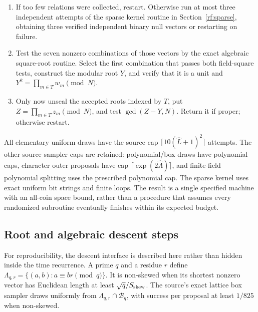 \begin{algorithm}
\begin{enumerate}[leftmargin=*]
\begin{enumerate}[label=\textup{(\alph*)},leftmargin=*]
Retain its sealed root.  Erase the root of every rejected trial.
\end{enumerate}
\item If too few relations were collected, restart.  Otherwise run
at most three independent attempts of the sparse kernel routine in
Section~\ref{rf:sparse}, obtaining three verified independent binary
null vectors or restarting on failure.
\item Test the seven nonzero combinations of those vectors by the
exact algebraic square-root routine.  Select the first combination
that passes both field-square tests, construct the modular root
$Y$, and verify that it is a unit and
$Y^2=\prod_{m\in T}w_m\pmod N$.
\item Only now unseal the accepted roots indexed by $T$, put
$Z=\prod_{m\in T}z_m\pmod N$, and test $\gcd(Z-Y,N)$.
Return it if proper; otherwise restart.
\end{enumerate}
\end{algorithm}

All elementary uniform draws have the source cap
$\lceil10(\widehat L+1)^2\rceil$ attempts.  The other source
sampler caps are retained: polynomial/box draws have polynomial
caps, character outer proposals have cap
$\lceil\exp(2\widehat\Lambda)\rceil$, and finite-field polynomial
splitting uses the prescribed polynomial cap.  The sparse kernel
uses exact uniform bit strings and finite loops.  The result is a
single specified machine with an all-coin space bound, rather than
a procedure that assumes every randomized subroutine eventually
finishes within its expected budget.

\subsection{Root and algebraic descent steps}
\label{rf:descent}

For reproducibility, the descent interface is described here rather
than hidden inside the time recurrence.  A prime $q$ and a residue
$r$ define
$\Lambda_{q,r}=\{(a,b):a\equiv br\pmod q\}$.
It is non-skewed when its shortest nonzero vector has Euclidean
length at least $\sqrt q/S_{\rm skew}$.  The source's exact lattice
box sampler draws uniformly from $\Lambda_{q,r}\cap\mathcal B_q$,
with success per proposal at least $1/825$ when non-skewed.

